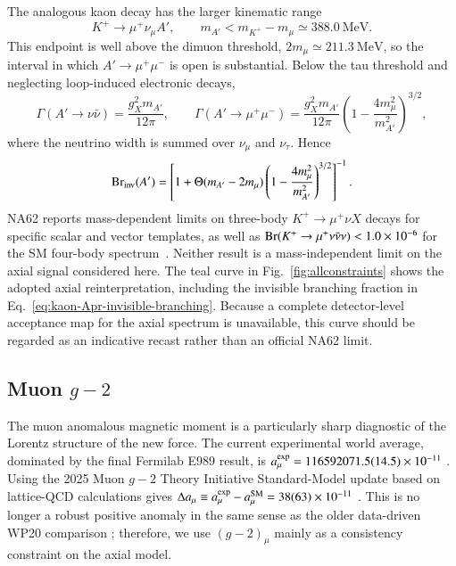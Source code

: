 \documentclass[onecolumn, aps, nofootinbib, prd, preprint, floats, floatfix, amsmath, amssymb, superscriptaddress, preprintnumbers]{revtex4-2}
\begin{document}
The analogous kaon decay has the larger kinematic range
\begin{equation}
K^+\to\mu^+\nu_\mu A',
\qquad
m_{A'}<m_{K^+}-m_\mu\simeq388.0~\mathrm{MeV}.
\end{equation}
This endpoint is well above the dimuon threshold, $2m_\mu\simeq211.3~\mathrm{MeV}$, so the interval in which $A'\to\mu^+\mu^-$ is open is substantial. Below the tau threshold and neglecting loop-induced electronic decays,
\begin{equation}
\Gamma(A'\to\nu\bar\nu)=\frac{g_X^2m_{A'}}{12\pi},
\qquad
\Gamma(A'\to\mu^+\mu^-)=\frac{g_X^2m_{A'}}{12\pi}
\left(1-\frac{4m_\mu^2}{m_{A'}^2}\right)^{3/2},
\end{equation}
where the neutrino width is summed over $\nu_\mu$ and $\nu_\tau$. Hence
\begin{equation}
{\rm Br}_{\rm inv}(A')=
\left[1+\Theta(m_{A'}-2m_\mu)
\left(1-\frac{4m_\mu^2}{m_{A'}^2}\right)^{3/2}\right]^{-1}.
\label{eq:kaon-Apr-invisible-branching}
\end{equation}
NA62 reports mass-dependent limits on three-body $K^+\to\mu^+\nu X$ decays for specific scalar and vector templates, as well as ${\rm Br}(K^+\to\mu^+\nu\bar\nu\nu)<1.0\times10^{-6}$ for the SM four-body spectrum~\cite{NA62:2021bji}. Neither result is a mass-independent limit on the axial signal considered here. The teal curve in Fig.~\ref{fig:allconstraints} shows the adopted axial reinterpretation, including the invisible branching fraction in Eq.~\eqref{eq:kaon-Apr-invisible-branching}. Because a complete detector-level acceptance map for the axial spectrum is unavailable, this curve should be regarded as an indicative recast rather than an official NA62 limit.

\subsection{Muon $g-2$}
\label{sec:muon_g-2}


The muon anomalous magnetic moment is a particularly sharp diagnostic of the Lorentz structure of the new force. The current experimental world average, dominated by the final Fermilab E989 result, is $a_\mu^{\rm exp}=116592071.5(14.5)\times10^{-11}$ \cite{Muong-2:2025xyk}. Using the 2025 Muon $g-2$ Theory Initiative Standard-Model update based on lattice-QCD calculations gives $\Delta a_\mu\equiv a_\mu^{\rm exp}-a_\mu^{\rm SM} =38(63)\times10^{-11}$ \cite{Muong-2:2025xyk,Aliberti:2025beg}. This is no longer a robust positive anomaly in the same sense as the older data-driven WP20 comparison \cite{Aoyama:2020ynm}; therefore, we use $(g-2)_\mu$ mainly as a consistency constraint on the axial model.
\end{document}
